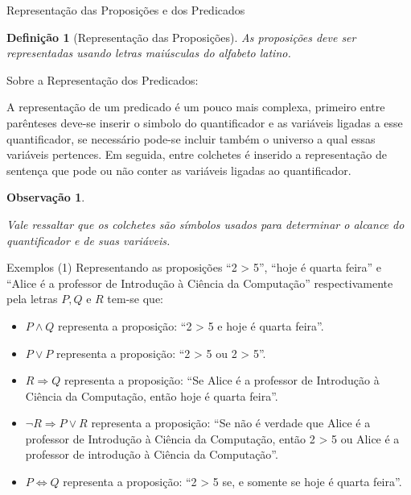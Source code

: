 \documentclass[aspectratio=169]{beamer}
\newtheorem{defi}{Definição}
\newtheorem{remark}{Observação}
\begin{document}
	\begin{frame}{Representação das Proposições e dos Predicados}
		\begin{defi}[Representação das Proposições]\label{def:RepresentacaoProposicoes}
			As proposições deve ser representadas usando letras maiúsculas do alfabeto latino.
		\end{defi}
		\pause
		\begin{alertblock}{Sobre a Representação dos Predicados:}
			\
			
			A representação de um predicado é um pouco mais complexa, primeiro entre parênteses deve-se inserir o simbolo do quantificador e as variáveis ligadas a esse quantificador, se necessário pode-se incluir também o universo a qual essas variáveis pertences. Em seguida, entre colchetes é inserido a representação de sentença que pode ou não conter as variáveis ligadas ao quantificador.
		\end{alertblock}
		\pause
		\begin{remark}
			\
			
			Vale ressaltar que os colchetes são símbolos usados para determinar o alcance do quantificador e de suas variáveis.
		\end{remark}
	\end{frame}

	\begin{frame}{Exemplos (1)}
			Representando as proposições ``2 > 5'', ``hoje é quarta feira'' e ``Alice é a professor de Introdução à Ciência da Computação'' respectivamente pela letras $P, Q$ e $R$ tem-se que:
			\begin{itemize}
				\item[(a)] $P \land Q$ representa a proposição: ``2 > 5 e hoje é quarta feira''.
				\item[(b)] $P \lor P$ representa a proposição: ``2 > 5 ou 2 > 5''.
				\item[(c)] $R \Rightarrow Q$ representa a proposição: ``Se Alice é a professor de Introdução à Ciência da Computação, então hoje é quarta feira''.
				\item[(d)] $\neg R \Rightarrow  P \lor R$ representa a proposição: ``Se não é verdade que Alice é a professor de Introdução à Ciência da Computação, então 2 > 5 ou  Alice é a professor de introdução à Ciência da Computação''.
				\item[(e)] $P \Leftrightarrow Q$ representa a proposição: ``2 > 5 se, e somente se hoje é quarta feira''.
			\end{itemize}
	\end{frame}
\end{document}
